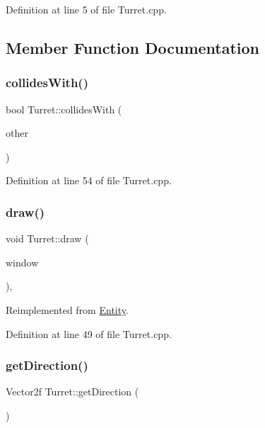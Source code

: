 Definition at line 5 of file Turret.\+cpp.



\subsection{Member Function Documentation}
\mbox{\label{class_turret_ada3f7ae7cdc24a5c24be131beb9887e8}} 
\subsubsection{\texorpdfstring{collides\+With()}{collidesWith()}}
{\footnotesize\ttfamily bool Turret\+::collides\+With (\begin{DoxyParamCaption}\item[{\hyperlink{class_entity}{Entity} $\ast$}]{other }\end{DoxyParamCaption})}



Definition at line 54 of file Turret.\+cpp.

\mbox{\label{class_turret_a7beef22798d993d9991bd22417034f49}} 
\subsubsection{\texorpdfstring{draw()}{draw()}}
{\footnotesize\ttfamily void Turret\+::draw (\begin{DoxyParamCaption}\item[{Render\+Window \&}]{window }\end{DoxyParamCaption})\hspace{0.3cm}{\ttfamily [override]}, {\ttfamily [virtual]}}



Reimplemented from \hyperlink{class_entity_a030c3aa6641df7981a2d8a3fba890ec7}{Entity}.



Definition at line 49 of file Turret.\+cpp.

\mbox{\label{class_turret_aee3e22c1794e60cd8f89d1da39a6e443}} 
\subsubsection{\texorpdfstring{get\+Direction()}{getDirection()}}
{\footnotesize\ttfamily Vector2f Turret\+::get\+Direction (\begin{DoxyParamCaption}{ }\end{DoxyParamCaption})}



